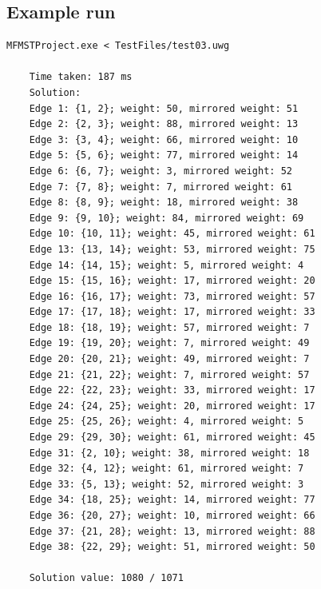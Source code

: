\documentclass[12pt]{report}
\begin{document}
\subsection{Example run}
\begin{lstlisting}[basicstyle=\footnotesize]
	MFMSTProject.exe < TestFiles/test03.uwg
	
	Time taken: 187 ms
	Solution:
	Edge 1: {1, 2}; weight: 50, mirrored weight: 51
	Edge 2: {2, 3}; weight: 88, mirrored weight: 13
	Edge 3: {3, 4}; weight: 66, mirrored weight: 10
	Edge 5: {5, 6}; weight: 77, mirrored weight: 14
	Edge 6: {6, 7}; weight: 3, mirrored weight: 52
	Edge 7: {7, 8}; weight: 7, mirrored weight: 61
	Edge 8: {8, 9}; weight: 18, mirrored weight: 38
	Edge 9: {9, 10}; weight: 84, mirrored weight: 69
	Edge 10: {10, 11}; weight: 45, mirrored weight: 61
	Edge 13: {13, 14}; weight: 53, mirrored weight: 75
	Edge 14: {14, 15}; weight: 5, mirrored weight: 4
	Edge 15: {15, 16}; weight: 17, mirrored weight: 20
	Edge 16: {16, 17}; weight: 73, mirrored weight: 57
	Edge 17: {17, 18}; weight: 17, mirrored weight: 33
	Edge 18: {18, 19}; weight: 57, mirrored weight: 7
	Edge 19: {19, 20}; weight: 7, mirrored weight: 49
	Edge 20: {20, 21}; weight: 49, mirrored weight: 7
	Edge 21: {21, 22}; weight: 7, mirrored weight: 57
	Edge 22: {22, 23}; weight: 33, mirrored weight: 17
	Edge 24: {24, 25}; weight: 20, mirrored weight: 17
	Edge 25: {25, 26}; weight: 4, mirrored weight: 5
	Edge 29: {29, 30}; weight: 61, mirrored weight: 45
	Edge 31: {2, 10}; weight: 38, mirrored weight: 18
	Edge 32: {4, 12}; weight: 61, mirrored weight: 7
	Edge 33: {5, 13}; weight: 52, mirrored weight: 3
	Edge 34: {18, 25}; weight: 14, mirrored weight: 77
	Edge 36: {20, 27}; weight: 10, mirrored weight: 66
	Edge 37: {21, 28}; weight: 13, mirrored weight: 88
	Edge 38: {22, 29}; weight: 51, mirrored weight: 50
	
	Solution value: 1080 / 1071
\end{lstlisting}
\end{document}
